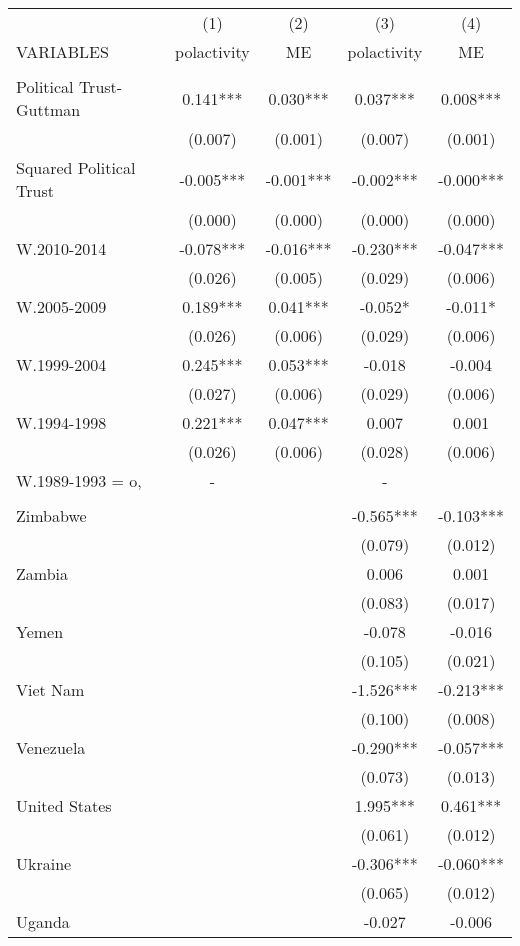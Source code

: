 \documentclass[]{article}
\begin{document}
\begin{tabular}{lcccc} \hline
 & (1) & (2) & (3) & (4) \\
VARIABLES & polactivity & ME & polactivity & ME \\ \hline
 &  &  &  &  \\
Political Trust-Guttman & 0.141*** & 0.030*** & 0.037*** & 0.008*** \\
 & (0.007) & (0.001) & (0.007) & (0.001) \\
Squared Political Trust & -0.005*** & -0.001*** & -0.002*** & -0.000*** \\
 & (0.000) & (0.000) & (0.000) & (0.000) \\
W.2010-2014 & -0.078*** & -0.016*** & -0.230*** & -0.047*** \\
 & (0.026) & (0.005) & (0.029) & (0.006) \\
W.2005-2009 & 0.189*** & 0.041*** & -0.052* & -0.011* \\
 & (0.026) & (0.006) & (0.029) & (0.006) \\
W.1999-2004 & 0.245*** & 0.053*** & -0.018 & -0.004 \\
 & (0.027) & (0.006) & (0.029) & (0.006) \\
W.1994-1998 & 0.221*** & 0.047*** & 0.007 & 0.001 \\
 & (0.026) & (0.006) & (0.028) & (0.006) \\
W.1989-1993 = o, & - &  & - &  \\
 &  &  &  &  \\
Zimbabwe &  &  & -0.565*** & -0.103*** \\
 &  &  & (0.079) & (0.012) \\
Zambia &  &  & 0.006 & 0.001 \\
 &  &  & (0.083) & (0.017) \\
Yemen &  &  & -0.078 & -0.016 \\
 &  &  & (0.105) & (0.021) \\
Viet Nam &  &  & -1.526*** & -0.213*** \\
 &  &  & (0.100) & (0.008) \\
Venezuela &  &  & -0.290*** & -0.057*** \\
 &  &  & (0.073) & (0.013) \\
United States &  &  & 1.995*** & 0.461*** \\
 &  &  & (0.061) & (0.012) \\
Ukraine &  &  & -0.306*** & -0.060*** \\
 &  &  & (0.065) & (0.012) \\
Uganda &  &  & -0.027 & -0.006 \\

\end{tabular}
\end{document}
